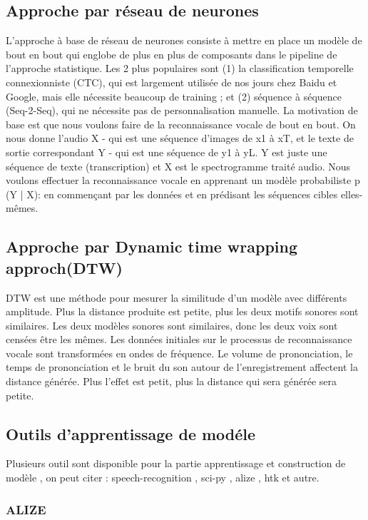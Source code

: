 \documentclass[a4paper, 12pt]{book}
\begin{document}
\subsection{Approche par réseau de neurones}

L'approche à base de réseau de neurones consiste à mettre en place un modèle de bout en bout qui englobe de plus en plus de composants dans le pipeline de l'approche statistique. Les 2 plus populaires sont (1) la classification temporelle connexionniste (CTC), qui est largement utilisée de nos jours chez Baidu et Google, mais elle nécessite beaucoup de training ; et (2) séquence à séquence (Seq-2-Seq), qui ne nécessite pas de personnalisation manuelle.
La motivation de base est que nous voulons faire de la reconnaissance vocale de bout en bout. On nous donne l'audio X - qui est une séquence d'images de x1 à xT, et le texte de sortie correspondant Y - qui est une séquence de y1 à yL. Y est juste une séquence de texte (transcription) et X est le spectrogramme traité audio. Nous voulons effectuer la reconnaissance vocale en apprenant un modèle probabiliste p (Y | X): en commençant par les données et en prédisant les séquences cibles elles-mêmes.


\subsection{Approche par Dynamic time wrapping approch(DTW)}
DTW est une méthode pour mesurer la similitude d'un modèle avec différents amplitude. Plus la distance produite est petite, plus les deux motifs sonores sont similaires. Les deux modèles sonores sont similaires, donc les deux voix sont censées être les mêmes. Les données initiales sur le processus de reconnaissance vocale sont transformées en ondes de fréquence. Le volume de prononciation, le temps de prononciation et le bruit du son autour de l'enregistrement affectent la distance générée. Plus l'effet est petit, plus la distance qui sera générée sera petite.

\subsection{Outils d'apprentissage de modéle}
Plusieurs outil sont disponible pour la partie apprentissage et construction de modèle , on peut citer : speech-recognition , sci-py , alize , htk et autre.

\subsubsection{ALIZE}
\end{document}
